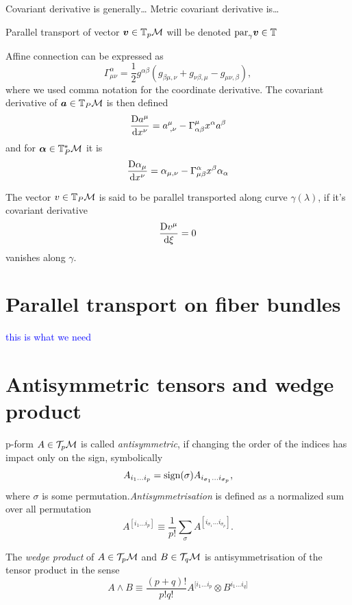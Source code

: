 Covariant derivative is generally\dots
Metric covariant derivative is\dots

Parallel transport of vector $\bm v\in \mathbb{T}_p \mathcal{M}$ will be denoted $\textrm{par}_\gamma \bm v\in \mathbb{T}_{}$

Affine connection can be expressed as
\begin{equation}
    \Gamma^{\alpha}_{\mu\nu} = \frac{1}{2}g^{\alpha \beta}\left(g_{\beta\mu,\nu}+g_{\nu\beta,\mu}-g_{\mu\nu,\beta}\right),
\end{equation}
where we used comma notation for the coordinate derivative.
The covariant derivative of $\bm a\in \mathbb{T}_P\mathcal{M}$ is then defined
\begin{equation}
    \frac{\mathrm{D} a^\mu}{\mathrm{d} x^\nu}=a_{\;,\nu}^\mu-\Gamma^\mu_{\alpha\beta} x^\alpha a^\beta 
\end{equation}
and for $\bm\alpha\in \mathbb{T}_P^*\mathcal{M}$ it is
\begin{equation}
    \frac{\mathrm{D} \alpha_\mu}{\mathrm{d} x^\nu}=\alpha_{\mu,\nu}-\Gamma^\alpha_{\mu\beta}x^\beta \alpha_\alpha 
\end{equation}

The vector $v\in \mathbb{T}_P\mathcal{M}$ is said to be parallel transported along curve $\gamma(\lambda)$, if it's covariant derivative
\begin{equation}
    \frac{\mathrm{D} v^\mu}{\mathrm{d} \xi}=0
\end{equation}
vanishes along $\gamma$.

\section{Parallel transport on fiber bundles}
\textcolor{blue}{this is what we need}

\section{Antisymmetric tensors and wedge product}
p-form $A\in \mathcal{T}_p \mathcal{M}$ is called \emph{antisymmetric}, if changing the order of the indices has impact only on the sign, symbolically
$$A_{i_1\dots i_p} = \operatorname{\textrm{sign}}(\sigma)A_{i_{\sigma_1}\dots i_{\sigma_p}},$$
where $\sigma$ is some permutation.\emph{Antisymmetrisation} is defined as a normalized sum over all permutation
\begin{equation}
    A^{[i_1\dots i_p]}\equiv \frac{1}{p!}\sum_\sigma A^{[i_{\sigma_1}\dots i_{\sigma_p}]}. 
\end{equation}

The \emph{wedge product} of $A\in \mathcal{T}_p \mathcal{M}$ and $B\in \mathcal{T}_q \mathcal{M}$ is antisymmetrisation of the tensor product in the sense
\begin{equation}
    A\wedge B\equiv \frac{(p+q)!}{p!q!} A^{[i_1\dots i_p}\otimes B^{i_1\dots i_q]}
\end{equation}
